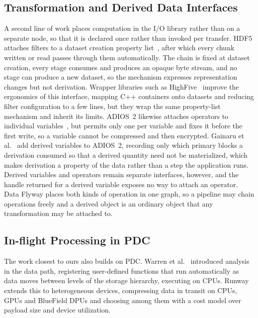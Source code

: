\subsection{Transformation and Derived Data Interfaces}

A second line of work places computation in the I/O library rather than on a separate node, so that it is declared once rather than invoked per transfer. HDF5 attaches filters to a dataset creation property list~\cite{hdf5}, after which every chunk written or read passes through them automatically. The chain is fixed at dataset creation, every stage consumes and produces an opaque byte stream, and no stage can produce a new dataset, so the mechanism expresses representation changes but not derivation. Wrapper libraries such as HighFive~\cite{highfive} improve the ergonomics of this interface, mapping C++ containers onto datasets and reducing filter configuration to a few lines, but they wrap the same property-list mechanism and inherit its limits. ADIOS~2 likewise attaches operators to individual variables~\cite{boyuka2014transparent, godoy2020adios2}, but permits only one per variable and fixes it before the first write, so a variable cannot be compressed and then encrypted. Gainaru et al.~\cite{gainaru2024toderive} add derived variables to ADIOS~2, recording only which primary blocks a derivation consumed so that a derived quantity need not be materialized, which makes derivation a property of the data rather than a step the application runs. Derived variables and operators remain separate interfaces, however, and the handle returned for a derived variable exposes no way to attach an operator. Data Flyway places both kinds of operation in one graph, so a pipeline may chain operations freely and a derived object is an ordinary object that any transformation may be attached to.

\subsection{In-flight Processing in PDC}
\label{sec:runway}

The work closest to ours also builds on PDC. Warren et al.~\cite{warren2019analysis} introduced analysis in the data path, registering user-defined functions that run automatically as data moves between levels of the storage hierarchy, executing on CPUs. Runway~\cite{ravi2023runway} extends this to heterogeneous devices, compressing data in transit on CPUs, GPUs and BlueField DPUs and choosing among them with a cost model over payload size and device utilization.

